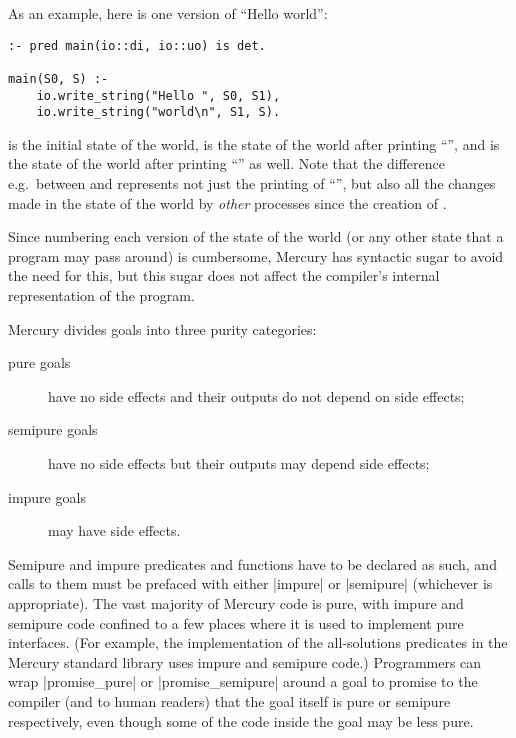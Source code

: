 As an example, here is one version of ``Hello world'':
\vspace{3mm}
\begin{verbatim}
:- pred main(io::di, io::uo) is det.

main(S0, S) :-
    io.write_string("Hello ", S0, S1),
    io.write_string("world\n", S1, S).
\end{verbatim}
\vspace{3mm}

\noindent
 is the initial state of the world,
 is the state of the world after printing ``'',
and  is the state of the world
after printing ``'' as well.
Note that the difference e.g.\ between  and 
represents not just the printing of ``'',
but also all the changes made in the state of the world
by \emph{other} processes since the creation of .

Since numbering each version of the state of the world
(or any other state that a program may pass around) is cumbersome,
Mercury has syntactic sugar to avoid the need for this,
but this sugar does not affect
the compiler's internal representation of the program.

\label{page:purity}
\noindent
Mercury divides goals into three purity categories:

\begin{description}

    \item[pure goals] have no side effects
    and their outputs do not depend on side effects;

    \item[semipure goals] have no side effects
    but their outputs may depend side effects;

    \item[impure goals] may have side effects.

\end{description}

\noindent
Semipure and impure predicates and functions
have to be declared as such,
and calls to them must be prefaced with either
\code|impure| or \code|semipure| (whichever is appropriate).
The vast majority of Mercury code is pure,
with impure and semipure code confined to a few places
where it is used to implement pure interfaces.
(For example, the implementation of the all-solutions predicates
in the Mercury standard library uses impure and semipure code.)
Programmers can wrap
\code|promise\_pure| or \code|promise\_semipure| around a goal
to promise to the compiler (and to human readers) that
the goal itself is pure or semipure respectively,
even though some of the code inside the goal may be less pure.

